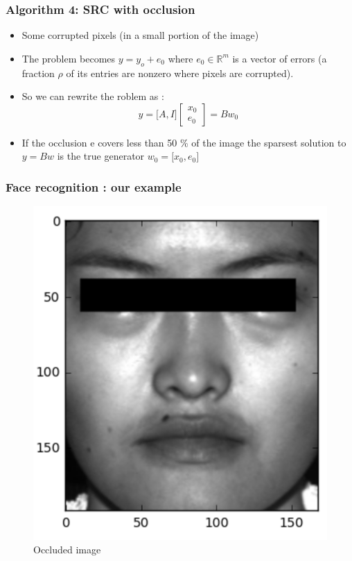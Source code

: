 \documentclass{beamer}
\begin{document}
\begin{frame}

		\frametitle{Algorithm 4: SRC with occlusion}		

\begin{itemize}

\item Some corrupted pixels (in a small portion of the image)
\item The problem becomes $y=y_{o}+e_{0}$ where $e_{0} \in \mathbb{R}^{m}$ is a vector of errors (a fraction $\rho$ of its entries are nonzero where pixels are corrupted). 
\item So we can rewrite the roblem as : $$y = \lbrack A,I \rbrack 
\begin{bmatrix}
           x_{0} \\
           e_{0} 
\end{bmatrix}=Bw_{0}$$

\item If the occlusion e covers less than 50 \% of the image the sparsest solution to $y=Bw$ is the true generator $w_{0}=\lbrack x_{0},e_{0} \rbrack $


\end{itemize}

\end{frame}


\begin{frame}
\frametitle{Face recognition : our example}

			\begin{figure}[!ht]
			\begin{center}
			\includegraphics[scale=0.4]{occluded_face.png}
			\end{center}
			\caption{Occluded image}
			\label{fa}
			\end{figure}
\end{frame}
\end{document}
